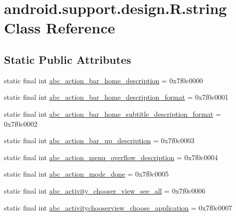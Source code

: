 \hypertarget{classandroid_1_1support_1_1design_1_1R_1_1string}{}\section{android.\+support.\+design.\+R.\+string Class Reference}
\label{classandroid_1_1support_1_1design_1_1R_1_1string}
\subsection*{Static Public Attributes}
\begin{DoxyCompactItemize}
\item 
static final int \mbox{\hyperlink{classandroid_1_1support_1_1design_1_1R_1_1string_ae94186933fbea8b608ced5c610548d2e}{abc\+\_\+action\+\_\+bar\+\_\+home\+\_\+description}} = 0x7f0c0000
\item 
static final int \mbox{\hyperlink{classandroid_1_1support_1_1design_1_1R_1_1string_aec1855ecfa354e84067b7fca0aa1a8de}{abc\+\_\+action\+\_\+bar\+\_\+home\+\_\+description\+\_\+format}} = 0x7f0c0001
\item 
static final int \mbox{\hyperlink{classandroid_1_1support_1_1design_1_1R_1_1string_abf2c1e6008ec0466820d6998146bd96c}{abc\+\_\+action\+\_\+bar\+\_\+home\+\_\+subtitle\+\_\+description\+\_\+format}} = 0x7f0c0002
\item 
static final int \mbox{\hyperlink{classandroid_1_1support_1_1design_1_1R_1_1string_a6879bf96dd0f053bc7b186fe5cc8fc3a}{abc\+\_\+action\+\_\+bar\+\_\+up\+\_\+description}} = 0x7f0c0003
\item 
static final int \mbox{\hyperlink{classandroid_1_1support_1_1design_1_1R_1_1string_a0da53f31459d40d1c77cb1a7e89746cb}{abc\+\_\+action\+\_\+menu\+\_\+overflow\+\_\+description}} = 0x7f0c0004
\item 
static final int \mbox{\hyperlink{classandroid_1_1support_1_1design_1_1R_1_1string_a650cb796af0ed2ed3305583ac1887224}{abc\+\_\+action\+\_\+mode\+\_\+done}} = 0x7f0c0005
\item 
static final int \mbox{\hyperlink{classandroid_1_1support_1_1design_1_1R_1_1string_a9b4629898f289df4ea77edefdf9f011f}{abc\+\_\+activity\+\_\+chooser\+\_\+view\+\_\+see\+\_\+all}} = 0x7f0c0006
\item 
static final int \mbox{\hyperlink{classandroid_1_1support_1_1design_1_1R_1_1string_a79f096c86588827bd6ad855469b5e54b}{abc\+\_\+activitychooserview\+\_\+choose\+\_\+application}} = 0x7f0c0007
\item 

\end{DoxyCompactItemize}
